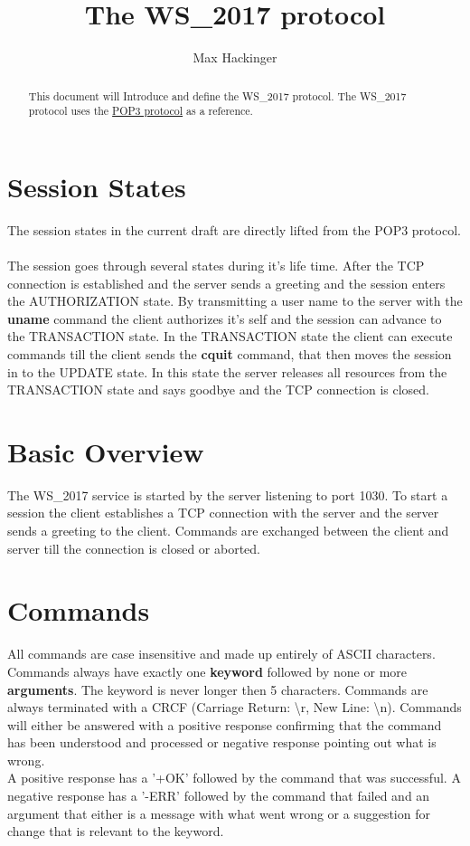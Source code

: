 \documentclass[a4paper,11pt]{article}
\title{The WS\_2017 protocol}
\author{Max Hackinger}
\begin{document}
\maketitle
\tableofcontents
\clearpage

\begin{abstract}
This document will Introduce and define the WS\_2017 protocol.
The WS\_2017 protocol uses the \href{https://tools.ietf.org/html/rfc1939}{POP3 protocol} as a reference.
\end{abstract}

\section{Session States}
The session states in the current draft are directly lifted from the POP3 protocol.\\\\
The session goes through several states during it's life time. After the TCP connection is established and the server sends a greeting and the session enters the AUTHORIZATION state. By transmitting a user name to the server with the \textbf{uname} command the client authorizes it's self and the session can advance to the TRANSACTION state. In the TRANSACTION state the client can execute commands till the client sends the \textbf{cquit} command, that then moves the session in to the UPDATE state. In this state the server releases all resources from the TRANSACTION state and says goodbye and the TCP connection is closed.

\section{Basic Overview}
The WS\_2017 service is started by the server listening to port 1030. To start a session the client establishes a TCP connection with the server and the server sends a greeting to the client. Commands are exchanged between the client and server till the connection is closed or aborted.

\section{Commands}
All commands are case insensitive and made up entirely of ASCII characters. Commands always have exactly one \textbf{keyword} followed by none or more \textbf{arguments}. The keyword is never longer then 5 characters. Commands are always terminated with a CRCF (Carriage Return: \textbackslash r, New Line: \textbackslash n). Commands will either be answered with a positive response confirming that the command has been understood and processed or negative response pointing out what is wrong.\\
A positive response has a '+OK' followed by the command that was successful. A negative response has a '-ERR' followed by the command that failed and an argument that either is a message with what went wrong or a suggestion for change that is relevant to the keyword.
\clearpage
\end{document}
